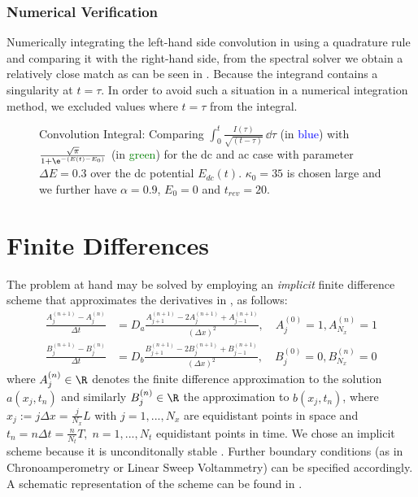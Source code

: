 \documentclass{prettytex/ox/mmsc-special-topic}
\begin{document}
  \subsubsection{Numerical Verification}
  Numerically integrating the left-hand side convolution in  using a quadrature rule and comparing it with the right-hand side, from the spectral solver we obtain a relatively close match as can be seen in .
  Because the integrand contains a singularity at $t = \tau$.
  In order to avoid such a situation in a numerical integration method, we excluded values where $t = \tau$ from the integral.
  \begin{figure}[H]
    \centering
    \caption{Convolution Integral: Comparing $\int_{0}^{t} \frac{I(\tau)}{\sqrt{(t - \tau)}} \,\dd\tau$ (in \textcolor{blue}{blue}) with $\frac{\sqrt{\pi}}{1 + \e^{-(E(t) - E_0)}}$ (in \textcolor{green}{green}) for the \gls{dc} and \gls{ac} case with parameter $\Delta E = 0.3$ over the \gls{dc} potential $E_{dc}(t)$. $\kappa_0 = 35$ is chosen large and we further have $\alpha = 0.9$, $E_0 = 0$ and $t_{rev} = 20$.}
    \label{fig:voltammetry-convolution}
  \end{figure}

  \section{Finite Differences}
  \label{sec:finite-differences}
  The problem at hand may be solved by employing an \emph{implicit} finite difference scheme that approximates the derivatives in , as follows:
  \begin{align}
    \label{eq:fd-scheme-a} \frac{A_{j}^{(n+1)} - A_{j}^{(n)}}{\Delta t} & = D_a \frac{A_{j+1}^{(n+1)} - 2 A_{j}^{(n+1)} + A_{j-1}^{(n+1)}}{(\Delta x)^2}, \quad A_j^{(0)} = 1, A_{N_x}^{(n)} = 1 \\
    \label{eq:fd-scheme-b} \frac{B_{j}^{(n+1)} - B_{j}^{(n)}}{\Delta t} & = D_b \frac{B_{j+1}^{(n+1)} - 2 B_{j}^{(n+1)} + B_{j-1}^{(n+1)}}{(\Delta x)^2}, \quad B_j^{(0)} = 0, B_{N_x}^{(n)} = 0
  \end{align}
  where $A_j^{(n)} \in \R$ denotes the finite difference approximation to the solution $a(x_j, t_n)$ and similarly $B_j^{(n)} \in \R$ the approximation to $b(x_j, t_n)$, where $x_j := j \Delta x = \frac{j}{N_x} L$ with $j = 1, ..., N_x$ are equidistant points in space and $t_n = n \Delta t = \frac{n}{N_t} T,\; n = 1, ..., N_t$ equidistant points in time.
  We chose an implicit scheme because it is unconditonally stable \parencite{süli_mayers_2003}.
  Further boundary conditions (as in Chronoamperometry or Linear Sweep Voltammetry) can be specified accordingly.
  A schematic representation of the scheme can be found in .
\end{document}
